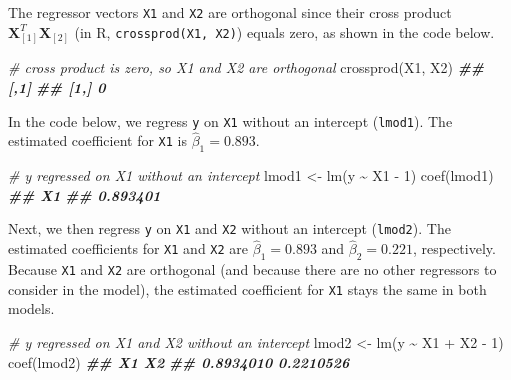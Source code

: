 \documentclass[
]{book}
\newenvironment{Shaded}{\begin{snugshade}}{\end{snugshade}}
\newcommand{\CommentTok}[1]{\textcolor[rgb]{0.56,0.35,0.01}{\textit{#1}}}
\newcommand{\DecValTok}[1]{\textcolor[rgb]{0.00,0.00,0.81}{#1}}
\newcommand{\DocumentationTok}[1]{\textcolor[rgb]{0.56,0.35,0.01}{\textbf{\textit{#1}}}}
\newcommand{\FunctionTok}[1]{\textcolor[rgb]{0.00,0.00,0.00}{#1}}
\newcommand{\NormalTok}[1]{#1}
\newcommand{\OtherTok}[1]{\textcolor[rgb]{0.56,0.35,0.01}{#1}}
\newcommand{\SpecialCharTok}[1]{\textcolor[rgb]{0.00,0.00,0.00}{#1}}
\theoremstyle{definition}
\theoremstyle{definition}
\theoremstyle{definition}
\theoremstyle{definition}
\theoremstyle{remark}
\begin{document}
The regressor vectors \texttt{X1} and \texttt{X2} are orthogonal since their cross product \(\mathbf{X}_{[1]}^T \mathbf{X}_{[2]}\) (in R, \texttt{crossprod(X1,\ X2)}) equals zero, as shown in the code below.

\begin{Shaded}
\begin{Highlighting}[]
\CommentTok{\# cross product is zero, so X1 and X2 are orthogonal}
\FunctionTok{crossprod}\NormalTok{(X1, X2)}
\DocumentationTok{\#\#      [,1]}
\DocumentationTok{\#\# [1,]    0}
\end{Highlighting}
\end{Shaded}

In the code below, we regress \texttt{y} on \texttt{X1} without an intercept (\texttt{lmod1}). The estimated coefficient for \texttt{X1} is \(\hat{\beta}_1=0.893\).

\begin{Shaded}
\begin{Highlighting}[]
\CommentTok{\# y regressed on X1 without an intercept}
\NormalTok{lmod1 }\OtherTok{\textless{}{-}} \FunctionTok{lm}\NormalTok{(y }\SpecialCharTok{\textasciitilde{}}\NormalTok{ X1 }\SpecialCharTok{{-}} \DecValTok{1}\NormalTok{)}
\FunctionTok{coef}\NormalTok{(lmod1)}
\DocumentationTok{\#\#       X1 }
\DocumentationTok{\#\# 0.893401}
\end{Highlighting}
\end{Shaded}

Next, we then regress \texttt{y} on \texttt{X1} and \texttt{X2} without an intercept (\texttt{lmod2}). The estimated coefficients for \texttt{X1} and \texttt{X2} are \(\hat{\beta}_1=0.893\) and \(\hat{\beta}_2=0.221\), respectively. Because \texttt{X1} and \texttt{X2} are orthogonal (and because there are no other regressors to consider in the model), the estimated coefficient for \texttt{X1} stays the
same in both models.

\begin{Shaded}
\begin{Highlighting}[]
\CommentTok{\# y regressed on X1 and X2 without an intercept}
\NormalTok{lmod2 }\OtherTok{\textless{}{-}} \FunctionTok{lm}\NormalTok{(y }\SpecialCharTok{\textasciitilde{}}\NormalTok{ X1 }\SpecialCharTok{+}\NormalTok{ X2 }\SpecialCharTok{{-}} \DecValTok{1}\NormalTok{)}
\FunctionTok{coef}\NormalTok{(lmod2)}
\DocumentationTok{\#\#        X1        X2 }
\DocumentationTok{\#\# 0.8934010 0.2210526}
\end{Highlighting}
\end{Shaded}
\end{document}
